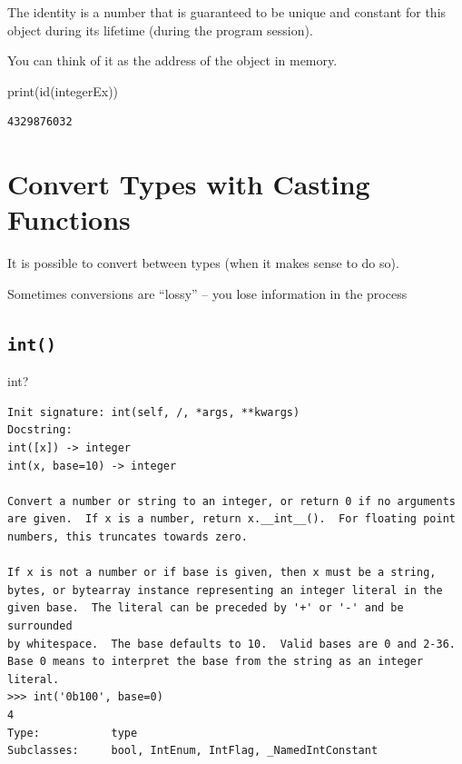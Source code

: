 \documentclass[
  letterpaper,
  DIV=11,
  numbers=noendperiod]{scrreprt}
\newenvironment{Shaded}{\begin{snugshade}}{\end{snugshade}}
\newcommand{\BuiltInTok}[1]{\textcolor[rgb]{0.00,0.23,0.31}{#1}}
\newcommand{\NormalTok}[1]{\textcolor[rgb]{0.00,0.23,0.31}{#1}}
\begin{document}
The identity is a number that is guaranteed to be unique and constant
for this object during its lifetime (during the program session).

You can think of it as the address of the object in memory.

\begin{Shaded}
\begin{Highlighting}[]
\BuiltInTok{print}\NormalTok{(}\BuiltInTok{id}\NormalTok{(integerEx))}
\end{Highlighting}
\end{Shaded}

\begin{verbatim}
4329876032
\end{verbatim}

\hypertarget{convert-types-with-casting-functions}{%
\chapter{Convert Types with Casting
Functions}\label{convert-types-with-casting-functions}}

It is possible to convert between types (when it makes sense to do so).

Sometimes conversions are ``lossy'' -- you lose information in the
process

\hypertarget{int}{%
\section{\texorpdfstring{\texttt{int()}}{int()}}\label{int}}

\begin{Shaded}
\begin{Highlighting}[]
\BuiltInTok{int}\NormalTok{?}
\end{Highlighting}
\end{Shaded}

\begin{verbatim}
Init signature: int(self, /, *args, **kwargs)
Docstring:     
int([x]) -> integer
int(x, base=10) -> integer

Convert a number or string to an integer, or return 0 if no arguments
are given.  If x is a number, return x.__int__().  For floating point
numbers, this truncates towards zero.

If x is not a number or if base is given, then x must be a string,
bytes, or bytearray instance representing an integer literal in the
given base.  The literal can be preceded by '+' or '-' and be surrounded
by whitespace.  The base defaults to 10.  Valid bases are 0 and 2-36.
Base 0 means to interpret the base from the string as an integer literal.
>>> int('0b100', base=0)
4
Type:           type
Subclasses:     bool, IntEnum, IntFlag, _NamedIntConstant
\end{verbatim}
\end{document}
